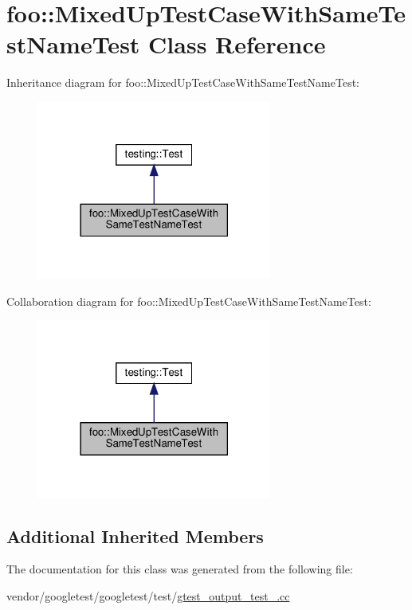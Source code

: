 \hypertarget{classfoo_1_1_mixed_up_test_case_with_same_test_name_test}{}\section{foo\+:\+:Mixed\+Up\+Test\+Case\+With\+Same\+Test\+Name\+Test Class Reference}
\label{classfoo_1_1_mixed_up_test_case_with_same_test_name_test}


Inheritance diagram for foo\+:\+:Mixed\+Up\+Test\+Case\+With\+Same\+Test\+Name\+Test\+:
\nopagebreak
\begin{figure}[H]
\begin{center}
\leavevmode
\includegraphics[width=218pt]{classfoo_1_1_mixed_up_test_case_with_same_test_name_test__inherit__graph}
\end{center}
\end{figure}


Collaboration diagram for foo\+:\+:Mixed\+Up\+Test\+Case\+With\+Same\+Test\+Name\+Test\+:
\nopagebreak
\begin{figure}[H]
\begin{center}
\leavevmode
\includegraphics[width=218pt]{classfoo_1_1_mixed_up_test_case_with_same_test_name_test__coll__graph}
\end{center}
\end{figure}
\subsection*{Additional Inherited Members}


The documentation for this class was generated from the following file\+:\begin{DoxyCompactItemize}
\item 
vendor/googletest/googletest/test/\hyperlink{gtest__output__test___8cc}{gtest\+\_\+output\+\_\+test\+\_\+.\+cc}\end{DoxyCompactItemize}

